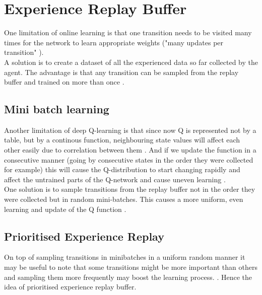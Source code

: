 \section{Experience Replay Buffer}

One limitation of online learning is that one transition needs to be visited many times for the network to learn appropriate weights ("many updates per transition" \cite{lecture_dqn}). \\

A solution is to create a dataset of all the experienced data so far collected by the agent. The advantage is that any transition can be sampled from the replay buffer and trained on more than once \cite{lecture_dqn}. 

\subsection{Mini batch learning }

Another limitation of deep Q-learning is that since now Q is represented not by a table, but by a continous function, neighbouring state values will affect each other easily due to correlation between them \cite{lecture_dqn} . And if 
we update the function in a consecutive manner (going by consecutive states in the order they were collected for example) this will cause the  Q-distribution to start changing rapidly and affect the untrained parts of the Q-network and cause uneven learning \cite{lecture_dqn}. \\

One solution is to sample transitions from the replay buffer not in the order they were collected but in random mini-batches\cite{lecture_dqn}. This causes a more uniform, even learning and update of the Q function \cite{lecture_dqn}.  


\subsection{Prioritised Experience Replay}

On top of sampling transitions in minibatches in a uniform random manner it may be useful to note that some transitions might be more important than others and sampling them more frequently may boost the learning process. \cite{lecture_dqn}. Hence the idea of prioritised experience replay buffer. \\

